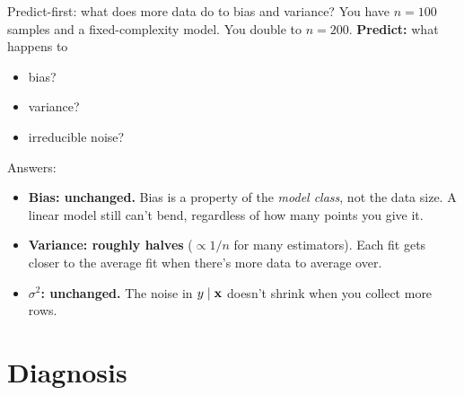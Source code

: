 \documentclass[aspectratio=169]{beamer}
\begin{document}
\begin{frame}{Predict-first: what does more data do to bias and variance?}
  You have $n = 100$ samples and a fixed-complexity model. You double to $n = 200$.
  \vfill
  \pause
  \textbf{Predict:} what happens to
  \begin{itemize}
    \item bias?
    \item variance?
    \item irreducible noise?
  \end{itemize}
  \pause
  \vfill
  Answers:
  \begin{itemize}
    \item \textbf{Bias: unchanged.} Bias is a property of the \emph{model class}, not the data size. A linear model still can't bend, regardless of how many points you give it.
    \item \textbf{Variance: roughly halves} ($\propto 1/n$ for many estimators). Each fit gets closer to the average fit when there's more data to average over.
    \item \textbf{$\sigma^2$: unchanged.} The noise in $y \mid \mathbf{x}$ doesn't shrink when you collect more rows.
  \end{itemize}
  \vfill
\end{frame}

\section{Diagnosis}
\end{document}
